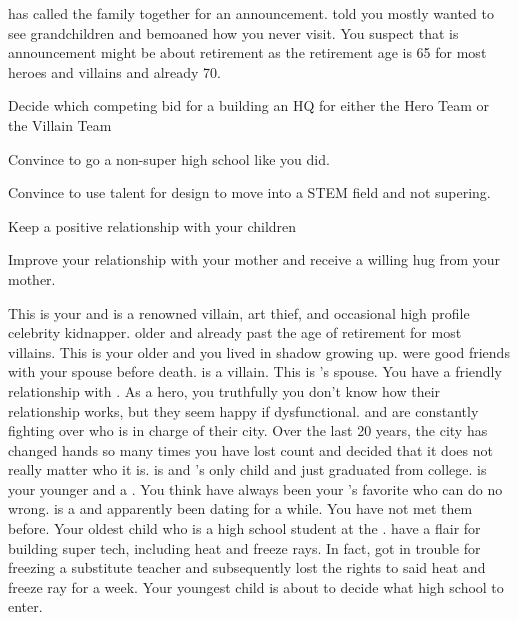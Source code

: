 \documentclass[char]{LRSguildcamp1}
\begin{document}
\cGrandma{} has called the family together for an announcement. \cGrandma{\They} told you mostly \cGrandma{\they} wanted to see \cGrandma{\their} grandchildren and bemoaned how you never visit.  You suspect that is announcement might be about \cGrandma{\their} retirement as the retirement age is 65 for most heroes and villains and \cGrandma{\theyare} already 70.  


\begin{itemz}[Goals]
	\item Decide which competing bid for a building an HQ for either the Hero Team or the Villain Team
	\item Convince \cTween{} to go a non-super high school like you did.  
	\item Convince \cTeen{} to use \cTeen{\their} talent for design to move into a STEM field and not supering.
	\item Keep a positive relationship with your children
	\item Improve your relationship with your mother and receive a willing hug from your mother.  
	\end{itemz}

\begin{itemz}[Notes]
	\item 
\end{itemz}



\begin{contacts}
	\contact{\cGrandma{}} This is your \cGrandma{\parent} and is a renowned villain, art thief, and occasional high profile celebrity kidnapper. \cGrandma{\Theyare} older and already past the age of retirement for most villains.
	\contact{\cOldest{}} This is your older \cOldest{\sibling} and you lived in \cOldest{\their} shadow growing up. \cOldest{\They} were good friends with your spouse before \cAS{\their} death. \cOldest{} is a villain. 
	\contact{\cOS{}} This is \cOldest{}'s spouse. You have a friendly relationship with \cOS{\them}. As a hero, you truthfully you don't know how their relationship works, but they seem happy if dysfunctional.  \cOldest{} and \cOS{} are constantly fighting over who is in charge of their city.  Over the last 20 years, the city has changed hands so many times you have lost count and decided that it does not really matter who it is. 
	\contact{\cGrad{}} \cGrad{} is \cOldest{} and \cOS{}'s only child and just graduated from college. 
	\contact{\cYoungest{}} \cYoungest{} is your younger \cYoungest{\sibling} and a \cYoungest{\hero}. You think  have always been your \cGrandma{\parent}'s favorite who can do no wrong. 
	\contact{\cYS{}} \cYS{} is a \cYS{\hero} and apparently been dating \cYoungest{} for a while. You have not met them before. 
	\contact{\cTeen{}} Your oldest child who is a high school student at the \pSuperSchool{}. \cTeen{\They} have a flair for building super tech, including heat and freeze rays. In fact, \cTeen{} got in trouble for freezing a substitute teacher and subsequently lost the rights to said heat and freeze ray for a week. 
	\contact{\cTween{}} Your youngest child is about to decide what high school to enter.
\end{contacts}
\end{document}
